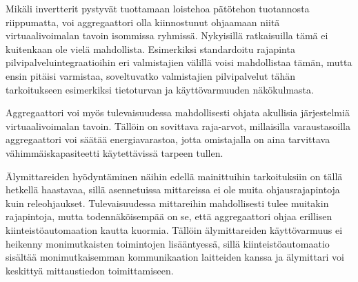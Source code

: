   Mikäli invertterit pystyvät tuottamaan loistehoa pätötehon tuotannosta riippumatta, voi aggregaattori olla kiinnostunut ohjaamaan niitä virtuaalivoimalan tavoin isommissa ryhmissä. Nykyisillä ratkaisuilla tämä ei kuitenkaan ole vielä mahdollista. Esimerkiksi standardoitu rajapinta pilvipalveluintegraatioihin eri valmistajien välillä voisi mahdollistaa tämän, mutta ensin pitäisi varmistaa, soveltuvatko valmistajien pilvipalvelut tähän tarkoitukseen esimerkiksi tietoturvan ja käyttövarmuuden näkökulmasta.

  Aggregaattori voi myös tulevaisuudessa mahdollisesti ohjata akullisia järjestelmiä virtuaalivoimalan tavoin. Tällöin on sovittava raja-arvot, millaisilla varaustasoilla aggregaattori voi säätää energiavarastoa, jotta omistajalla on aina tarvittava vähimmäiskapasiteetti käytettävissä tarpeen tullen.
  
  Älymittareiden hyödyntäminen näihin edellä mainittuihin tarkoituksiin on tällä hetkellä haastavaa, sillä asennetuissa mittareissa ei ole muita ohjausrajapintoja kuin releohjaukset. Tulevaisuudessa mittareihin mahdollisesti tulee muitakin rajapintoja, mutta todennäköisempää on se, että aggregaattori ohjaa erillisen kiinteistöautomaation kautta kuormia. Tällöin älymittareiden käyttövarmuus ei heikenny monimutkaisten toimintojen lisääntyessä, sillä kiinteistöautomaatio sisältää monimutkaisemman kommunikaation laitteiden kanssa ja älymittari voi keskittyä mittaustiedon toimittamiseen.
